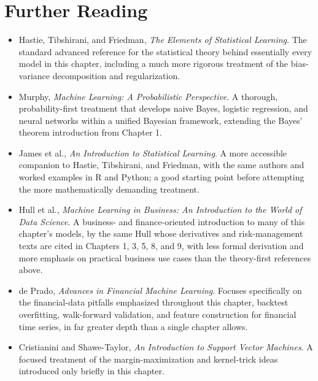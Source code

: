 \documentclass[../ai_in_finance]{subfiles}
\begin{document}
\section{Further Reading}

\begin{itemize}
    \item Hastie, Tibshirani, and Friedman, \emph{The Elements of Statistical Learning}. The standard advanced reference for the statistical theory behind essentially every model in this chapter, including a much more rigorous treatment of the bias-variance decomposition and regularization.
    \item Murphy, \emph{Machine Learning: A Probabilistic Perspective}. A thorough, probability-first treatment that develops naive Bayes, logistic regression, and neural networks within a unified Bayesian framework, extending the Bayes' theorem introduction from Chapter 1.
    \item James et al., \emph{An Introduction to Statistical Learning}. A more accessible companion to Hastie, Tibshirani, and Friedman, with the same authors and worked examples in R and Python; a good starting point before attempting the more mathematically demanding treatment.
    \item Hull et al., \emph{Machine Learning in Business: An Introduction to the World of Data Science}. A business- and finance-oriented introduction to many of this chapter's models, by the same Hull whose derivatives and risk-management texts are cited in Chapters 1, 3, 5, 8, and 9, with less formal derivation and more emphasis on practical business use cases than the theory-first references above.
    \item de Prado, \emph{Advances in Financial Machine Learning}. Focuses specifically on the financial-data pitfalls emphasized throughout this chapter, backtest overfitting, walk-forward validation, and feature construction for financial time series, in far greater depth than a single chapter allows.
    \item Cristianini and Shawe-Taylor, \emph{An Introduction to Support Vector Machines}. A focused treatment of the margin-maximization and kernel-trick ideas introduced only briefly in this chapter.
\end{itemize}
\end{document}
